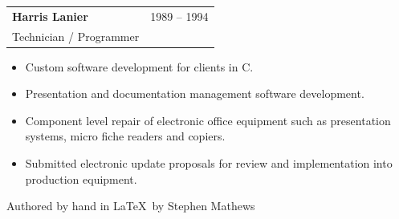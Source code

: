 \documentclass[10pt]{report}
\begin{document}
\noindent
\begin{tabular}{ L{.5\textwidth}  R{.4\textwidth} }
\textbf{\large Harris Lanier}  & 1989 -- 1994 \\
Technician / Programmer &
\end{tabular}

\begin{itemize}
\item Custom software development for clients in C.
\item Presentation and documentation management software development.
\item Component level repair of electronic office equipment such as presentation systems, micro fiche readers and copiers.
\item Submitted electronic update proposals for review and implementation into production equipment.
\end{itemize}
\bigskip





\vfill

\center



{Authored by hand in \LaTeX\ by Stephen Mathews}
\end{document}
